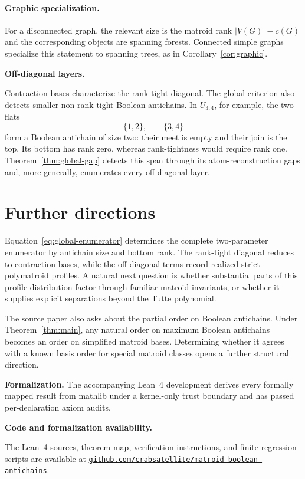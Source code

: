 \documentclass[11pt]{article}
\theoremstyle{definition}
\theoremstyle{remark}
\begin{document}
\paragraph{Graphic specialization.}
For a disconnected graph, the relevant size is the matroid rank
$|V(G)|-c(G)$ and the corresponding objects are spanning forests.
Connected simple graphs specialize this statement to spanning trees, as in
Corollary~\ref{cor:graphic}.

\medskip\noindent\textbf{Off-diagonal layers.}\par\noindent
Contraction bases characterize the rank-tight diagonal.  The global
criterion also detects smaller non-rank-tight Boolean antichains.  In
$U_{3,4}$, for example, the two flats
\[
 \{1,2\},\qquad\{3,4\}
\]
form a Boolean antichain of size two: their meet is empty and their join is
the top.  Its bottom has rank zero, whereas rank-tightness would require rank
one.  Theorem~\ref{thm:global-gap} detects this span through its
atom-reconstruction gaps and, more generally, enumerates every off-diagonal
layer.

\section{Further directions}

Equation~\eqref{eq:global-enumerator} determines the complete two-parameter
enumerator by antichain size and bottom rank.  The rank-tight diagonal reduces
to contraction bases, while the off-diagonal terms record realized strict
polymatroid profiles.  A natural next question is whether substantial parts
of this profile distribution factor through familiar matroid invariants, or
whether it supplies explicit separations beyond the Tutte polynomial.

The source paper also asks about the partial order on Boolean antichains.
Under Theorem~\ref{thm:main}, any natural order on maximum Boolean antichains
becomes an order on simplified matroid bases.  Determining whether it agrees
with a known basis order for special matroid classes opens a further
structural direction.

\begingroup
\footnotesize
\medskip
\noindent
\textbf{Formalization.}
The accompanying Lean~4 development derives every formally mapped result from
mathlib under a kernel-only trust boundary and has passed per-declaration
axiom audits.

\medskip
\noindent\textbf{Code and formalization availability.}\par
The Lean~4 sources, theorem map, verification instructions, and finite
regression scripts are available at
\href{https://github.com/crabsatellite/matroid-boolean-antichains}
{\nolinkurl{github.com/crabsatellite/matroid-boolean-antichains}}.
\end{document}
